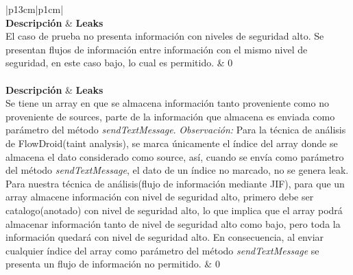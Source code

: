 \begin{table}[t]
\small\addtolength{\tabcolsep}{-3pt}
\begin{tabular}{|p{13cm}|p{1cm}|}
	\\
	\hline
	\textbf{Descripción} & \textbf{Leaks}\\
	\hline
	El caso de prueba no presenta información con niveles de seguridad alto. Se
	presentan flujos de información entre información con el mismo nivel de
	seguridad, en este caso bajo, lo cual es permitido. & 0 \\
	\hline
	\\
	\hline
	\textbf{Descripción} & \textbf{Leaks}\\
	\hline
	Se tiene un array en que se almacena información tanto proveniente como no
	proveniente de sources, parte de la información que almacena es enviada como
	parámetro del método \textit{sendTextMessage}. \textit{Observación:}
	Para la técnica de análisis de FlowDroid(taint analysis), se marca únicamente el
	índice del array donde se almacena el dato considerado como source, así,
	cuando se envía como parámetro del método \textit{sendTextMessage},
	el dato de un índice no marcado, no se genera leak. Para nuestra técnica
	de análisis(flujo de información mediante JIF), para que un array almacene
	información con nivel de seguridad alto, primero debe ser catalogo(anotado)
	con nivel de seguridad alto, lo que implica que el array podrá almacenar
	información tanto de nivel de seguridad alto como bajo, pero toda la
	información quedará con nivel de seguridad alto. En consecuencia, al enviar
	cualquier índice del array como parámetro del método
	\textit{sendTextMessage} se presenta un flujo de información no
	permitido. & 0
	\\

\end{tabular}
\end{table}
